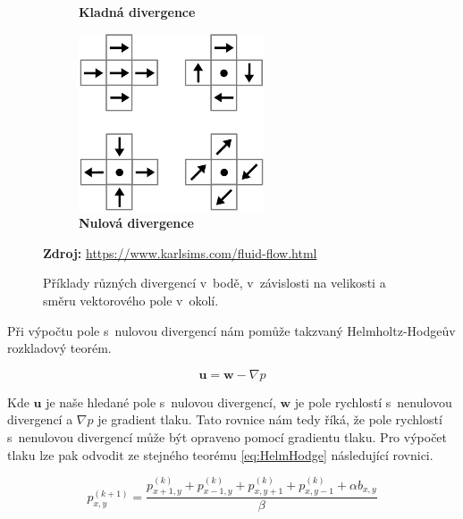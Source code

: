 \begin{figure}[h]
\begin{subfigure}{.3\textwidth}
	\caption{\textbf{Kladná divergence}}
	\label{fig:Lagran}
\end{subfigure}
\begin{subfigure}{.3\textwidth}
  	\centering
	\includegraphics[width=0.8\linewidth]{obrazky-figures/div-zero.png}
	\caption{\textbf{Nulová divergence}}
	\label{fig:Lagran}
\end{subfigure}
\caption{Příklady různých divergencí v~bodě, v~závislosti na velikosti a směru vektorového pole v~okolí.}
\textbf{Zdroj:} \url{https://www.karlsims.com/fluid-flow.html}
\label{fig:div}
\end{figure}

Při výpočtu pole s~nulovou divergencí nám pomůže takzvaný Helmholtz-Hodgeův rozkladový teorém.

\begin{equation}
\mathbf{u} = \mathbf{w} - \nabla p    
\label{eq:HelmHodge}
\end{equation}

Kde $\mathbf{u}$ je naše hledané pole s~nulovou divergencí, $\mathbf{w}$ je pole rychlostí s~nenulovou divergencí a $\nabla p$ je gradient tlaku. Tato rovnice nám tedy říká, že pole rychlostí s~nenulovou divergencí může být opraveno pomocí gradientu tlaku. Pro výpočet tlaku lze pak odvodit ze stejného teorému \ref{eq:HelmHodge} následující rovnici. \cite{webglFluid}

\begin{equation}
    p_{x,y}^{(k+1)} = \frac{p_{x+1,y}^{(k)} + p_{x-1,y}^{(k)} + p_{x,y+1}^{(k)} + p_{x,y-1}^{(k)} + \alpha b_{x,y}}{\beta}
\end{equation}

